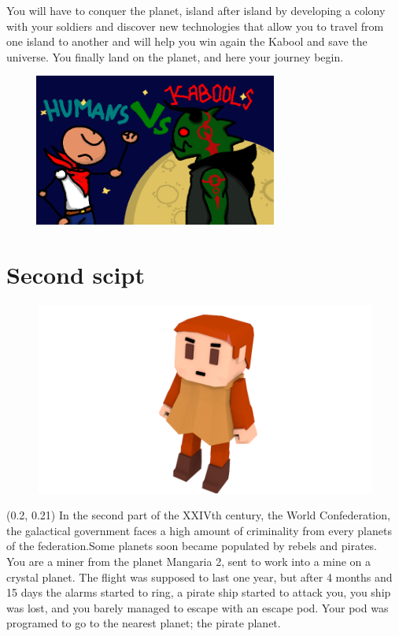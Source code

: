 \documentclass[article]{report} %
\begin{document}
				You will have to conquer the planet, island after island by developing a colony with your soldiers and discover new technologies that allow 
				you to travel from one island to another and will help you win again the Kabool and save the universe.
				You finally land on the planet, and here your journey begin. 

\begin{center}				
\includegraphics[width=10cm, height=5cm]{images/Others/fun.png}
\end{center}

				\newpage
			\section{Second scipt}
				\begin{figure}[h]
				\includegraphics[scale=0.8]{images/Graphics/char.png}
				\end{figure}
				\begin{textblock}{0.22}(0.2, 0.21)
					 In the second part of the XXIVth century, the World Confederation, the galactical government faces a high amount of criminality from every planets of the federation.Some planets soon became populated by rebels and pirates.\\

 You are a miner from the planet Mangaria 2, sent to work into a mine on a crystal planet. The flight was supposed to last one year, but after 4 months and 15 days the alarms started to ring, a pirate ship started to attack you, you ship was lost, and you barely managed to escape with an escape pod. Your pod was programed to go to the nearest planet; the pirate planet.\\
				\end{textblock}
\end{document}
